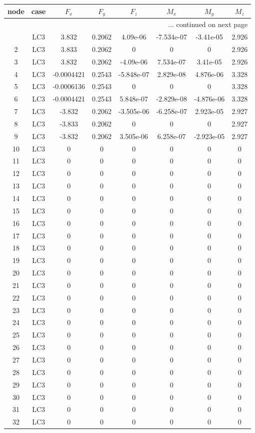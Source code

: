 \documentclass{article}%
\begin{document}
\begin{longtable}{| c c | c c c c c c |}%
\hline%
node&case&$F_x$&$F_y$&$F_z$&$M_x$&$M_y$&$M_z$\\%
\hline%
\endhead%
\hline%
\multicolumn{8}{r}{... continued on next page}\\%
\endfoot%
\hline%
\endlastfoot%
1&LC3&3.832&0.2062&4.09e{-}06&{-}7.534e{-}07&{-}3.41e{-}05&2.926\\%
2&LC3&3.833&0.2062&0&0&0&2.926\\%
3&LC3&3.832&0.2062&{-}4.09e{-}06&7.534e{-}07&3.41e{-}05&2.926\\%
4&LC3&{-}0.0004421&0.2543&{-}5.848e{-}07&2.829e{-}08&4.876e{-}06&3.328\\%
5&LC3&{-}0.0006136&0.2543&0&0&0&3.328\\%
6&LC3&{-}0.0004421&0.2543&5.848e{-}07&{-}2.829e{-}08&{-}4.876e{-}06&3.328\\%
7&LC3&{-}3.832&0.2062&{-}3.505e{-}06&{-}6.258e{-}07&2.923e{-}05&2.927\\%
8&LC3&{-}3.833&0.2062&0&0&0&2.927\\%
9&LC3&{-}3.832&0.2062&3.505e{-}06&6.258e{-}07&{-}2.923e{-}05&2.927\\%
10&LC3&0&0&0&0&0&0\\%
11&LC3&0&0&0&0&0&0\\%
12&LC3&0&0&0&0&0&0\\%
13&LC3&0&0&0&0&0&0\\%
14&LC3&0&0&0&0&0&0\\%
15&LC3&0&0&0&0&0&0\\%
16&LC3&0&0&0&0&0&0\\%
17&LC3&0&0&0&0&0&0\\%
18&LC3&0&0&0&0&0&0\\%
19&LC3&0&0&0&0&0&0\\%
20&LC3&0&0&0&0&0&0\\%
21&LC3&0&0&0&0&0&0\\%
22&LC3&0&0&0&0&0&0\\%
23&LC3&0&0&0&0&0&0\\%
24&LC3&0&0&0&0&0&0\\%
25&LC3&0&0&0&0&0&0\\%
26&LC3&0&0&0&0&0&0\\%
27&LC3&0&0&0&0&0&0\\%
28&LC3&0&0&0&0&0&0\\%
29&LC3&0&0&0&0&0&0\\%
30&LC3&0&0&0&0&0&0\\%
31&LC3&0&0&0&0&0&0\\%
32&LC3&0&0&0&0&0&0\\%

\end{longtable}
\end{document}
